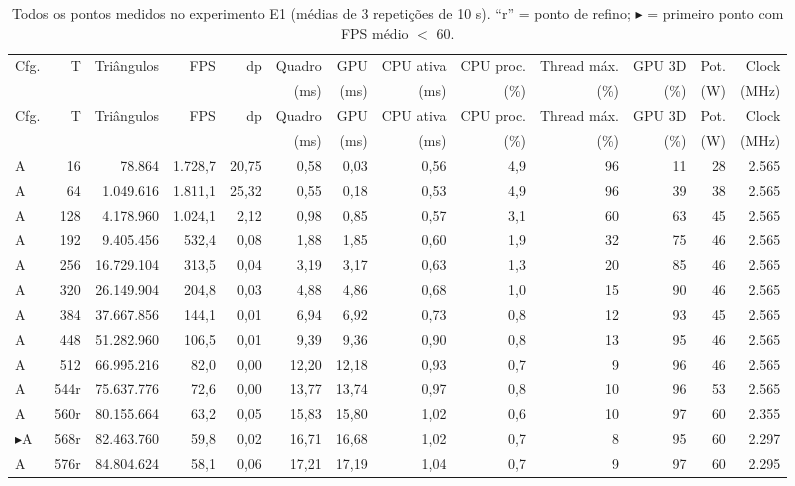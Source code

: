 {\scriptsize
\setlength{\tabcolsep}{2.6pt}
\begin{longtable}{l r r r r r r r r r r r r}
\caption{Todos os pontos medidos no experimento E1 (médias de 3 repetições de 10 s). ``r'' = ponto de refino; $\blacktriangleright$ = primeiro ponto com FPS médio $<$ 60.}\label{tab:pontos_e1}\\
\toprule
Cfg. & T & Triângulos & FPS & dp & Quadro & GPU & CPU ativa & CPU proc. & Thread máx. & GPU 3D & Pot. & Clock \\
 & & & & & (ms) & (ms) & (ms) & (\%) & (\%) & (\%) & (W) & (MHz) \\
\midrule
\endfirsthead
\toprule
Cfg. & T & Triângulos & FPS & dp & Quadro & GPU & CPU ativa & CPU proc. & Thread máx. & GPU 3D & Pot. & Clock \\
 & & & & & (ms) & (ms) & (ms) & (\%) & (\%) & (\%) & (W) & (MHz) \\
\midrule
\endhead
A & 16 & 78.864 & 1.728,7 & 20,75 & 0,58 & 0,03 & 0,56 & 4,9 & 96 & 11 & 28 & 2.565 \\
A & 64 & 1.049.616 & 1.811,1 & 25,32 & 0,55 & 0,18 & 0,53 & 4,9 & 96 & 39 & 38 & 2.565 \\
A & 128 & 4.178.960 & 1.024,1 & 2,12 & 0,98 & 0,85 & 0,57 & 3,1 & 60 & 63 & 45 & 2.565 \\
A & 192 & 9.405.456 & 532,4 & 0,08 & 1,88 & 1,85 & 0,60 & 1,9 & 32 & 75 & 46 & 2.565 \\
A & 256 & 16.729.104 & 313,5 & 0,04 & 3,19 & 3,17 & 0,63 & 1,3 & 20 & 85 & 46 & 2.565 \\
A & 320 & 26.149.904 & 204,8 & 0,03 & 4,88 & 4,86 & 0,68 & 1,0 & 15 & 90 & 46 & 2.565 \\
A & 384 & 37.667.856 & 144,1 & 0,01 & 6,94 & 6,92 & 0,73 & 0,8 & 12 & 93 & 45 & 2.565 \\
A & 448 & 51.282.960 & 106,5 & 0,01 & 9,39 & 9,36 & 0,90 & 0,8 & 13 & 95 & 46 & 2.565 \\
A & 512 & 66.995.216 & 82,0 & 0,00 & 12,20 & 12,18 & 0,93 & 0,7 & 9 & 96 & 46 & 2.565 \\
A & 544r & 75.637.776 & 72,6 & 0,00 & 13,77 & 13,74 & 0,97 & 0,8 & 10 & 96 & 53 & 2.565 \\
A & 560r & 80.155.664 & 63,2 & 0,05 & 15,83 & 15,80 & 1,02 & 0,6 & 10 & 97 & 60 & 2.355 \\
$\blacktriangleright$A & 568r & 82.463.760 & 59,8 & 0,02 & 16,71 & 16,68 & 1,02 & 0,7 & 8 & 95 & 60 & 2.297 \\
A & 576r & 84.804.624 & 58,1 & 0,06 & 17,21 & 17,19 & 1,04 & 0,7 & 9 & 97 & 60 & 2.295 \\

\end{longtable}}
